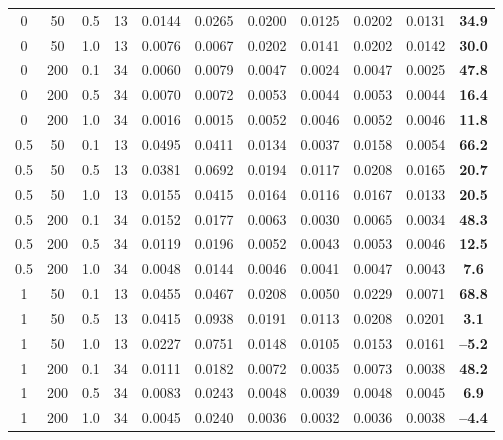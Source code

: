 \begin{table}[ht!]
\begin{tabular}{ccccccccccc}
0 & 50 & 0.5 & 13 & 0.0144 & 0.0265 & 0.0200 & 0.0125 & 0.0202 & 0.0131 & \textbf{34.9} \\
0 & 50 & 1.0 & 13 & 0.0076 & 0.0067 & 0.0202 & 0.0141 & 0.0202 & 0.0142 & \textbf{30.0} \\
\hline
0 & 200 & 0.1 & 34 & 0.0060 & 0.0079 & 0.0047 & 0.0024 & 0.0047 & 0.0025 & \textbf{47.8} \\
0 & 200 & 0.5 & 34 & 0.0070 & 0.0072 & 0.0053 & 0.0044 & 0.0053 & 0.0044 & \textbf{16.4} \\
0 & 200 & 1.0 & 34 & 0.0016 & 0.0015 & 0.0052 & 0.0046 & 0.0052 & 0.0046 & \textbf{11.8} \\
\hline\hline
0.5 & 50 & 0.1 & 13 & 0.0495 & 0.0411 & 0.0134 & 0.0037 & 0.0158 & 0.0054 & \textbf{66.2} \\
0.5 & 50 & 0.5 & 13 & 0.0381 & 0.0692 & 0.0194 & 0.0117 & 0.0208 & 0.0165 & \textbf{20.7} \\
0.5 & 50 & 1.0 & 13 & 0.0155 & 0.0415 & 0.0164 & 0.0116 & 0.0167 & 0.0133 & \textbf{20.5} \\
\hline
0.5 & 200 & 0.1 & 34 & 0.0152 & 0.0177 & 0.0063 & 0.0030 & 0.0065 & 0.0034 & \textbf{48.3} \\
0.5 & 200 & 0.5 & 34 & 0.0119 & 0.0196 & 0.0052 & 0.0043 & 0.0053 & 0.0046 & \textbf{12.5} \\
0.5 & 200 & 1.0 & 34 & 0.0048 & 0.0144 & 0.0046 & 0.0041 & 0.0047 & 0.0043 & \textbf{7.6} \\
\hline\hline
1 & 50 & 0.1 & 13 & 0.0455 & 0.0467 & 0.0208 & 0.0050 & 0.0229 & 0.0071 & \textbf{68.8} \\
1 & 50 & 0.5 & 13 & 0.0415 & 0.0938 & 0.0191 & 0.0113 & 0.0208 & 0.0201 & \textbf{3.1} \\
1 & 50 & 1.0 & 13 & 0.0227 & 0.0751 & 0.0148 & 0.0105 & 0.0153 & 0.0161 & \textbf{--5.2} \\
\hline
1 & 200 & 0.1 & 34 & 0.0111 & 0.0182 & 0.0072 & 0.0035 & 0.0073 & 0.0038 & \textbf{48.2} \\
1 & 200 & 0.5 & 34 & 0.0083 & 0.0243 & 0.0048 & 0.0039 & 0.0048 & 0.0045 & \textbf{6.9} \\
1 & 200 & 1.0 & 34 & 0.0045 & 0.0240 & 0.0036 & 0.0032 & 0.0036 & 0.0038 & \textbf{--4.4} \\
\hline\hline
\end{tabular}
\end{table}
